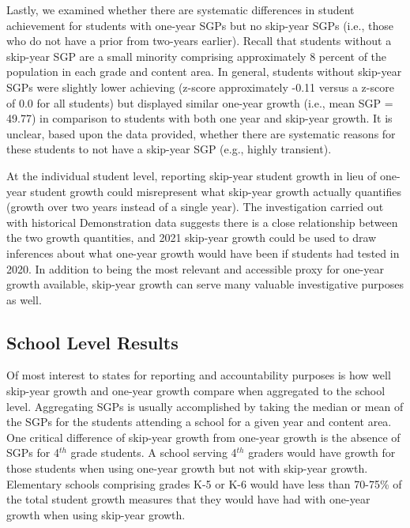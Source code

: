 \documentclass[12pt]{article}
\begin{document}
Lastly, we examined whether there are systematic differences in student
achievement for students with one-year SGPs but no skip-year SGPs (i.e.,
those who do not have a prior from two-years earlier). Recall that
students without a skip-year SGP are a small minority comprising
approximately 8 percent of the population in each grade and content
area. In general, students without skip-year SGPs were slightly lower
achieving (z-score approximately -0.11 versus a z-score of 0.0 for all
students) but displayed similar one-year growth (i.e., mean SGP = 49.77)
in comparison to students with both one year and skip-year growth. It is
unclear, based upon the data provided, whether there are systematic
reasons for these students to not have a skip-year SGP (e.g., highly
transient).

At the individual student level, reporting skip-year student growth in
lieu of one-year student growth could misrepresent what skip-year growth
actually quantifies (growth over two years instead of a single year).
The investigation carried out with historical Demonstration data
suggests there is a close relationship between the two growth
quantities, and 2021 skip-year growth could be used to draw inferences
about what one-year growth would have been if students had tested in
2020. In addition to being the most relevant and accessible proxy for
one-year growth available, skip-year growth can serve many valuable
investigative purposes as well.

\hypertarget{school-level-results}{%
\subsection{School Level Results}\label{school-level-results}}

Of most interest to states for reporting and accountability purposes is
how well skip-year growth and one-year growth compare when aggregated to
the school level. Aggregating SGPs is usually accomplished by taking the
median or mean of the SGPs for the students attending a school for a
given year and content area. One critical difference of skip-year growth
from one-year growth is the absence of SGPs for 4\(^{th}\) grade
students. A school serving 4\(^{th}\) graders would have growth for
those students when using one-year growth but not with skip-year growth.
Elementary schools comprising grades K-5 or K-6 would have less than
70-75\% of the total student growth measures that they would have had
with one-year growth when using skip-year growth.
\end{document}
